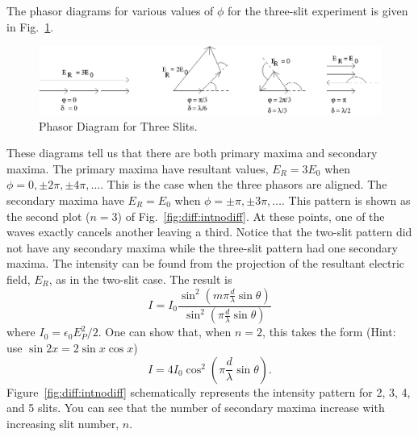 The phasor diagrams for various values of $\phi$ for the three-slit experiment
is given in Fig.~\ref{fig:diff:phasors_3slit}.
\begin{figure}[htb]
\centering 
\epsfxsize=14cm \includegraphics{10_diffraction/phasors_3slit.eps}
\caption{Phasor Diagram for Three Slits.}
\label{fig:diff:phasors_3slit}
\end{figure}
These diagrams tell us that there are both primary maxima 
and secondary maxima.  The primary maxima have resultant values, $E_R = 3E_0$
when $\phi = 0, \pm2 \pi, \pm 4 \pi,\dots$.  This is the case when the three 
phasors are aligned.  The secondary maxima have $E_R = E_0$ when 
$\phi = \pm \pi, \pm 3\pi,\dots$.  This pattern is shown as the second plot 
($n=3$) of Fig.~\ref{fig:diff:intnodiff}.  At these points, one of the waves
exactly cancels another leaving a third.  Notice that the two-slit
pattern did not have any secondary maxima while the three-slit pattern had
one secondary maxima.  The intensity can be found from the projection
of the resultant electric field, $E_R$, as in the two-slit case.  The
result is
\begin{equation}
I   =  I_0 \frac{\sin^2 \left(m \pi \frac{d}{\lambda} \sin \theta\right)}
                 {\sin^2 \left(  \pi \frac{d}{\lambda} \sin \theta\right)}
\label{eqn:diff:multiI}
\end{equation}
where $I_0 = \epsilon_0 E_P^2/2$. One can show that, when $n=2$,
this takes the form (Hint: use $\sin 2x = 2 \sin x \cos x$)
$$I=4I_0\cos^2\left(\pi \frac{d}{\lambda} \sin \theta\right).$$
Figure~\ref{fig:diff:intnodiff} schematically represents
the intensity pattern for 2, 3, 4, and 5 slits.
You can see that the number of secondary maxima increase with increasing 
slit number, $n$.

